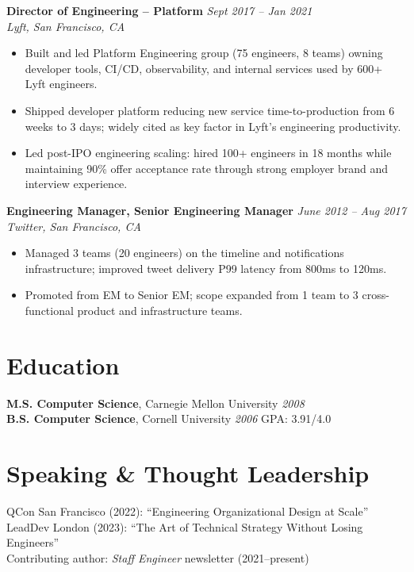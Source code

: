 \documentclass[11pt,a4paper]{article}
\begin{document}
\vspace{6pt}
\noindent\textbf{Director of Engineering -- Platform} \hfill \textit{Sept 2017 -- Jan 2021}\\
\textit{Lyft, San Francisco, CA}
\begin{itemize}
  \item Built and led Platform Engineering group (75 engineers, 8 teams) owning developer tools, CI/CD, observability, and internal services used by 600+ Lyft engineers.
  \item Shipped developer platform reducing new service time-to-production from 6 weeks to 3 days; widely cited as key factor in Lyft's engineering productivity.
  \item Led post-IPO engineering scaling: hired 100+ engineers in 18 months while maintaining 90\% offer acceptance rate through strong employer brand and interview experience.
\end{itemize}

\vspace{6pt}
\noindent\textbf{Engineering Manager, Senior Engineering Manager} \hfill \textit{June 2012 -- Aug 2017}\\
\textit{Twitter, San Francisco, CA}
\begin{itemize}
  \item Managed 3 teams (20 engineers) on the timeline and notifications infrastructure; improved tweet delivery P99 latency from 800ms to 120ms.
  \item Promoted from EM to Senior EM; scope expanded from 1 team to 3 cross-functional product and infrastructure teams.
\end{itemize}

\section{Education}
\textbf{M.S. Computer Science}, Carnegie Mellon University \hfill \textit{2008}\\
\textbf{B.S. Computer Science}, Cornell University \hfill \textit{2006} \quad GPA: 3.91/4.0

\section{Speaking \& Thought Leadership}
QCon San Francisco (2022): ``Engineering Organizational Design at Scale''\\
LeadDev London (2023): ``The Art of Technical Strategy Without Losing Engineers''\\
Contributing author: \textit{Staff Engineer} newsletter (2021--present)
\end{document}

